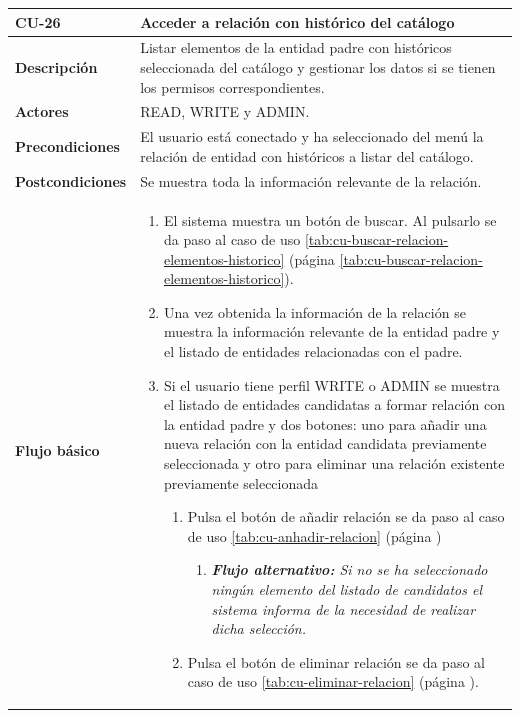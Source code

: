 \begin{table} [H]
    \centering
    \setlength{\leftmargini}{0.4cm}
	\resizebox{14cm}{!} { %
    \begin{tabular}{| m{3cm} | m{11cm} |}   
    \hline
	  \textbf{CU-26} & \textbf{Acceder a relación con histórico del catálogo} \\\hline
	  \textbf{Descripción} & Listar elementos de la entidad  padre con históricos seleccionada del catálogo y gestionar los datos si se tienen los permisos correspondientes. \\\hline
	  \textbf{Actores} & READ, WRITE y ADMIN. \\\hline
	  \textbf{Precondiciones} & El usuario está conectado y ha seleccionado del menú la relación de entidad con históricos a listar del catálogo. \\\hline
	  \textbf{Postcondiciones} & Se muestra toda la información relevante de la relación. \\\hline
	  \textbf{Flujo básico} & 
		\begin{enumerate}
	  	\item El sistema muestra un botón de buscar. Al pulsarlo se da paso al caso de uso \ref{tab:cu-buscar-relacion-elementos-historico} (página \ref{tab:cu-buscar-relacion-elementos-historico}).
	  	\item Una vez obtenida la información de la relación se muestra la información relevante de la entidad padre y el listado de entidades relacionadas con el padre.
	  	\item Si el usuario tiene perfil WRITE o ADMIN se muestra el listado de entidades candidatas a formar relación con la entidad padre y dos botones: uno para añadir una nueva relación con la entidad candidata previamente seleccionada y otro para eliminar una relación existente previamente seleccionada
	  	\begin{enumerate}
		        \item Pulsa el botón de añadir relación se da paso al caso de uso \ref{tab:cu-anhadir-relacion} (página \pageref{tab:cu-anhadir-relacion})
					\begin{enumerate}	
			   		\item  \textit{\textbf{Flujo alternativo:} Si no se ha seleccionado ningún elemento del listado de candidatos el sistema informa de la necesidad de realizar dicha selección.}
			   		\end{enumerate}		
		        \item Pulsa el botón de eliminar relación se da paso al caso de uso \ref{tab:cu-eliminar-relacion} (página \pageref{tab:cu-eliminar-relacion}).

\end{enumerate}
\end{enumerate}
\end{tabular}}
\end{table}
